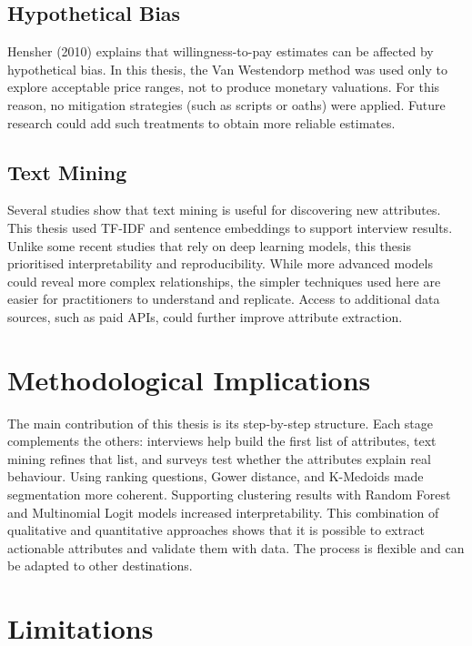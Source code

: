 \documentclass[a4paper, 12pt, twoside]{report}  %
\begin{document}
\subsection{Hypothetical Bias}

\indent Hensher (2010) explains that willingness-to-pay estimates can be affected by hypothetical bias. In this thesis, the Van Westendorp method was used only to explore acceptable price ranges, not to produce monetary valuations. For this reason, no mitigation strategies (such as scripts or oaths) were applied. Future research could add such treatments to obtain more reliable estimates.

\subsection{Text Mining}

\indent Several studies show that text mining is useful for discovering new attributes. This thesis used TF-IDF and sentence embeddings to support interview results. Unlike some recent studies that rely on deep learning models, this thesis prioritised interpretability and reproducibility. While more advanced models could reveal more complex relationships, the simpler techniques used here are easier for practitioners to understand and replicate. Access to additional data sources, such as paid APIs, could further improve attribute extraction.

\section{Methodological Implications}

\indent The main contribution of this thesis is its step-by-step structure. Each stage complements the others: interviews help build the first list of attributes, text mining refines that list, and surveys test whether the attributes explain real behaviour. Using ranking questions, Gower distance, and K-Medoids made segmentation more coherent. Supporting clustering results with Random Forest and Multinomial Logit models increased interpretability. This combination of qualitative and quantitative approaches shows that it is possible to extract actionable attributes and validate them with data. The process is flexible and can be adapted to other destinations.

\section{Limitations}
\end{document}
